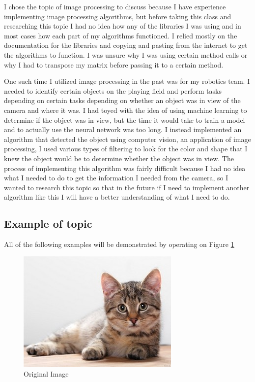 \documentclass{../mathhomework}
\begin{document}
I chose the topic of image processing to discuss because I have experience implementing image processing 
algorithms, but before taking this class and researching this topic I had no idea how any of the libraries 
I was using and in most cases how each part of my algorithms functioned. I relied mostly on the documentation 
for the libraries and copying and pasting from the internet to get the algorithms to function. I was unsure why
 I was using certain method calls or why I had to transpose my matrix before passing it to a certain method.

One such time I utilized image processing in the past was for my robotics team. I needed to identify certain 
objects on the playing field and perform tasks depending on certain tasks depending on whether an object was in 
view of the camera and where it was. I had toyed with the idea of using machine learning to determine if the 
object was in view, but the time it would take to train a model and to actually use the neural network was too 
long. I instead implemented an algorithm that detected the object using computer vision, an application of image 
processing, I used various types of filtering to look for the color and shape that I knew the object would be to 
determine whether the object was in view. The process of implementing this algorithm was fairly difficult because 
I had no idea what I needed to do to get the information I needed from the camera, so I wanted to research this 
topic so that in the future if I need to implement another algorithm like this I will have a better understanding 
of what I need to do.


\subsection{Example of topic}

All of the following examples will be demonstrated by operating on Figure \ref{fig1}

\begin{figure}[H] 
    \begin{center}
        \includegraphics{figures/original.jpg}
    \end{center}
    \caption{Original Image}
    \label{fig1}
\end{figure}    
\end{document}
